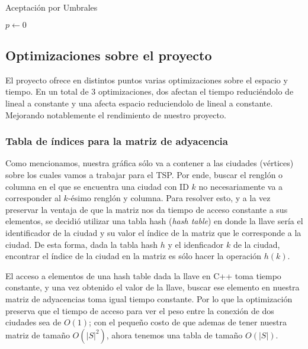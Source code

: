 \documentclass{article}
\newcommand{\tit}[1]{\textit{#1}}
\begin{document}
\begin{itemize}
      \begin{algorithm}[H]
        \caption{Aceptación por Umbrales}
        \SetAlgoLined
        $p \leftarrow 0$\;
      \end{algorithm}
  \end{itemize}
  
  \subsection{Optimizaciones sobre el proyecto}

  El proyecto ofrece en distintos puntos varias optimizaciones
  sobre el espacio y tiempo. En un total de 3 optimizaciones, 
  dos afectan el tiempo reduciéndolo de lineal a constante 
  y una afecta espacio reduciendolo de lineal a constante. 
  Mejorando notablemente el rendimiento de nuestro 
  proyecto.
  
  \subsubsection{Tabla de índices para la matriz de adyacencia}
  Como mencionamos, nuestra gráfica sólo va a contener a las 
  ciudades (vértices) sobre los cuales vamos a trabajar para el 
  TSP. Por ende, buscar el renglón o columna en el que se 
  encuentra una ciudad con ID $k$ no necesariamente va a corresponder
  al $k$-ésimo renglón y columna. Para resolver esto, y a la vez 
  preservar la ventaja de que la matriz nos da tiempo de acceso 
  constante a sus elementos, se decidió utilizar una tabla 
  hash (\tit{hash table}) en donde la llave sería el identificador 
  de la ciudad y su valor el índice de la matriz que le corresponde 
  a la ciudad. De esta forma, dada la tabla hash $h$ y el 
  idenficador $k$ de la ciudad, encontrar el índice de la ciudad 
  en la matriz es sólo hacer la operación $h(k)$.

  El acceso a elementos de una hash table dada la llave en C++
  toma tiempo constante, y una vez obtenido el valor de la 
  llave, buscar ese elemento en nuestra matriz de adyacencias 
  toma igual tiempo constante. Por lo que la optimización preserva
  que el tiempo de acceso para ver el peso entre la conexión de 
  dos ciudades sea de $O(1)$; con el pequeño costo de que ademas 
  de tener nuestra matriz de tamaño $O(|S|^2)$, ahora 
  tenemos una tabla de tamaño $O(|S|)$.
  
\end{document}
